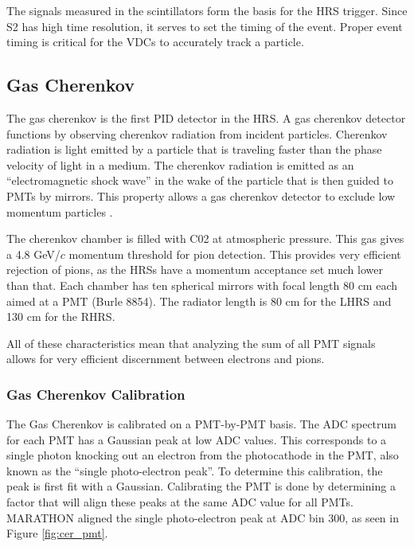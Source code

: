 The signals measured in the scintillators form the basis for the HRS trigger. Since S2 has high time resolution, it serves to set the timing of the event. Proper event timing is critical for the VDCs to accurately track a particle.

\subsection{Gas Cherenkov}
\label{sec:cer}

The gas cherenkov is the first PID detector in the HRS. A gas cherenkov detector functions by observing cherenkov radiation from incident particles. Cherenkov radiation is light emitted by a particle that is traveling faster than the phase velocity of light in a medium. The cherenkov radiation is emitted as an ``electromagnetic shock wave'' in the wake of the particle that is then guided to PMTs by mirrors. This property allows a gas cherenkov detector to exclude low momentum particles \cite{Leo}.

The cherenkov chamber is filled with C02 at atmospheric pressure. This gas gives a 4.8 GeV/$c$  momentum threshold for pion detection. This provides very efficient rejection of pions, as the HRSs have a momentum acceptance set much lower than that. Each chamber has ten spherical mirrors with focal length 80 cm each aimed at a PMT (Burle 8854). The radiator length is 80 cm for the LHRS and 130 cm for the RHRS.

All of these characteristics mean that analyzing the sum of all PMT signals allows for very efficient discernment between electrons and pions.

\subsubsection{Gas Cherenkov Calibration}

The Gas Cherenkov is calibrated on a PMT-by-PMT basis. The ADC spectrum for each PMT has a Gaussian peak at low ADC values. This corresponds to a single photon knocking out an electron from the photocathode in the PMT, also known as the ``single photo-electron peak''. To determine this calibration, the peak is first fit with a Gaussian. Calibrating the PMT is done by determining a factor that will align these peaks at the same ADC value for all PMTs. MARATHON aligned the single photo-electron peak at ADC bin 300, as seen in Figure \ref{fig:cer_pmt}.

